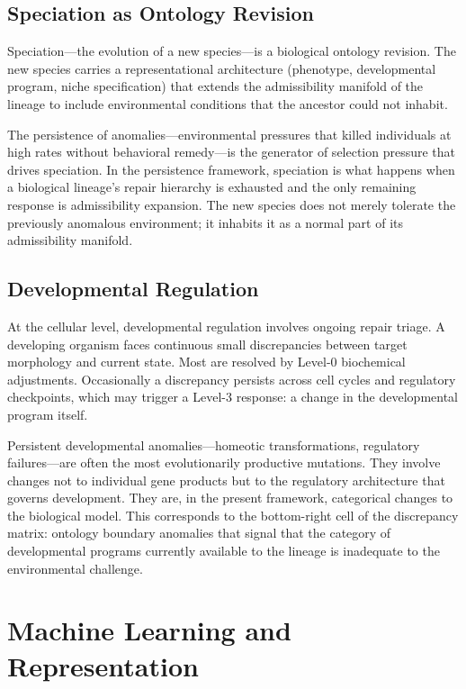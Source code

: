 \documentclass[12pt,oneside]{book}
\theoremstyle{plain}
\theoremstyle{definition}
\theoremstyle{remark}
\newcommand{\1}{\mathbf{1}}
\begin{document}
\section{Speciation as Ontology Revision}

Speciation---the evolution of a new species---is a biological ontology revision. The new species carries a representational architecture (phenotype, developmental program, niche specification) that extends the admissibility manifold of the lineage to include environmental conditions that the ancestor could not inhabit.

The persistence of anomalies---environmental pressures that killed individuals at high rates without behavioral remedy---is the generator of selection pressure that drives speciation. In the persistence framework, speciation is what happens when a biological lineage's repair hierarchy is exhausted and the only remaining response is admissibility expansion. The new species does not merely tolerate the previously anomalous environment; it inhabits it as a normal part of its admissibility manifold.

\section{Developmental Regulation}

At the cellular level, developmental regulation involves ongoing repair triage. A developing organism faces continuous small discrepancies between target morphology and current state. Most are resolved by Level-0 biochemical adjustments. Occasionally a discrepancy persists across cell cycles and regulatory checkpoints, which may trigger a Level-3 response: a change in the developmental program itself.

Persistent developmental anomalies---homeotic transformations, regulatory failures---are often the most evolutionarily productive mutations. They involve changes not to individual gene products but to the regulatory architecture that governs development. They are, in the present framework, categorical changes to the biological model. This corresponds to the bottom-right cell of the discrepancy matrix: ontology boundary anomalies that signal that the category of developmental programs currently available to the lineage is inadequate to the environmental challenge.


\chapter{Machine Learning and Representation}
\end{document}
